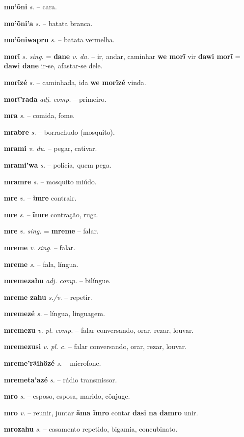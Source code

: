 \textbf{mo'õni} \textit{s.} -- cara.

\textbf{mo'õni'a} \textit{s.} -- batata branca.

\textbf{mo'õniwapru} \textit{s.} -- batata vermelha.

\textbf{morĩ} \textit{s. sing.} = \textbf{dane} \textit{v. du.} -- ir, andar, caminhar  \textbf{we morĩ} vir  \textbf{dawi morĩ} = \textbf{dawi dane} ir-se, afastar-se dele.

\textbf{morĩzé} \textit{s.} -- caminhada, ida  \textbf{we morĩzé} vinda.

\textbf{morĩ'rada} \textit{adj. comp.} -- primeiro.

\textbf{mra} \textit{s.} -- comida, fome.

\textbf{mrabre} \textit{s.} -- borrachudo (mosquito).

\textbf{mrami} \textit{v. du.} -- pegar, cativar.

\textbf{mrami'wa} \textit{s.} -- polícia, quem pega.

\textbf{mramre} \textit{s.} -- mosquito miúdo.

\textbf{mre} \textit{v.} -- \textbf{ĩmre} contrair.

\textbf{mre} \textit{s.} -- \textbf{ĩmre} contração, ruga.

\textbf{mre} \textit{v. sing.} = \textbf{mreme} -- falar.

\textbf{mreme} \textit{v. sing.} -- falar.

\textbf{mreme} \textit{s.} -- fala, língua.

\textbf{mremezahu} \textit{adj. comp.} -- bilíngue.

\textbf{mreme zahu} \textit{s./v.} -- repetir.

\textbf{mremezé} \textit{s.} -- língua, linguagem.

\textbf{mremezu} \textit{v. pl. comp.} -- falar conversando, orar, rezar, louvar.

\textbf{mremezusi} \textit{v. pl. c.} -- falar conversando, orar, rezar, louvar.

\textbf{mreme'rãihözé} \textit{s.} -- microfone.

\textbf{mremeta'azé} \textit{s.} -- rádio transmissor.

\textbf{mro} \textit{s.} -- esposo, esposa, marido, cônjuge.

\textbf{mro} \textit{v.} -- reunir, juntar  \textbf{ãma ĩmro} contar  \textbf{dasi na damro} unir.

\textbf{mrozahu} \textit{s.} -- casamento repetido, bigamia, concubinato.

